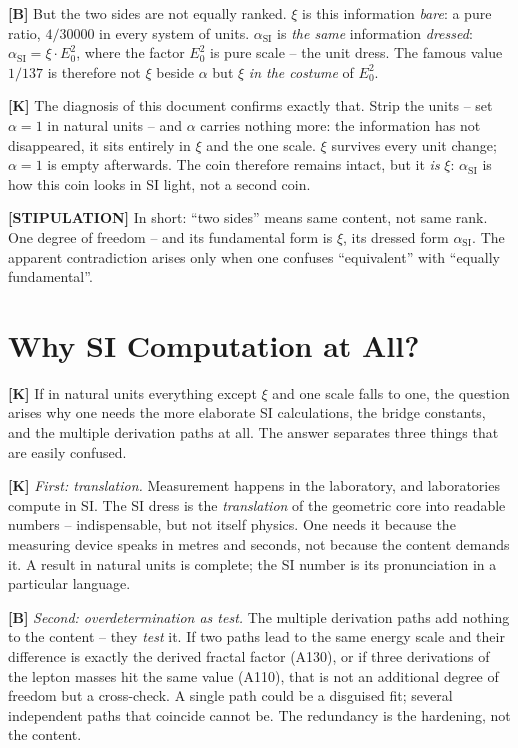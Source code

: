 \textbf{[B]} But the two sides are not equally ranked. $\xi$ is this information
\emph{bare}: a pure ratio, $4/30000$ in every system of units. $\alpha_\text{SI}$
is \emph{the same} information \emph{dressed}: $\alpha_\text{SI} = \xi\cdot E_0^2$,
where the factor $E_0^2$ is pure scale -- the unit dress. The famous value $1/137$
is therefore not $\xi$ beside $\alpha$ but $\xi$ \emph{in the costume} of $E_0^2$.

\textbf{[K]} The diagnosis of this document confirms exactly that. Strip the units
-- set $\alpha = 1$ in natural units -- and $\alpha$ carries nothing more: the
information has not disappeared, it sits entirely in $\xi$ and the one scale.
$\xi$ survives every unit change; $\alpha = 1$ is empty afterwards. The coin
therefore remains intact, but it \emph{is} $\xi$: $\alpha_\text{SI}$ is how this
coin looks in SI light, not a second coin.

\textbf{[STIPULATION]} In short: ``two sides'' means same content, not same rank.
One degree of freedom -- and its fundamental form is $\xi$, its dressed form
$\alpha_\text{SI}$. The apparent contradiction arises only when one confuses
``equivalent'' with ``equally fundamental''.

\section{Why SI Computation at All?}

\textbf{[K]} If in natural units everything except $\xi$ and one scale falls to
one, the question arises why one needs the more elaborate SI calculations, the
bridge constants, and the multiple derivation paths at all. The answer separates
three things that are easily confused.

\textbf{[K]} \emph{First: translation.} Measurement happens in the laboratory, and
laboratories compute in SI. The SI dress is the \emph{translation} of the geometric
core into readable numbers -- indispensable, but not itself physics. One needs it
because the measuring device speaks in metres and seconds, not because the content
demands it. A result in natural units is complete; the SI number is its
pronunciation in a particular language.

\textbf{[B]} \emph{Second: overdetermination as test.} The multiple derivation
paths add nothing to the content -- they \emph{test} it. If two paths lead to the
same energy scale and their difference is exactly the derived fractal factor (A130),
or if three derivations of the lepton masses hit the same value (A110), that is not
an additional degree of freedom but a cross-check. A single path could be a
disguised fit; several independent paths that coincide cannot be. The redundancy is
the hardening, not the content.

